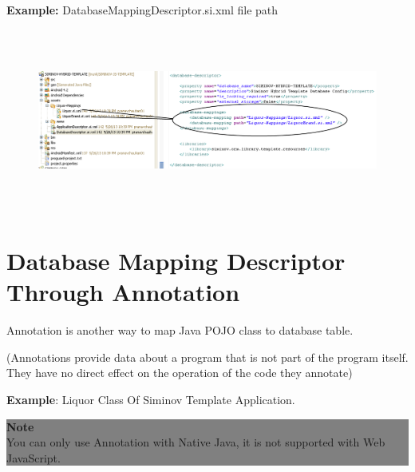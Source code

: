 		\par
		\textbf{Example:} DatabaseMappingDescriptor.si.xml file path
		\begin{figure}[htbp]
			\centering
				\includegraphics[height=6cm]{Resources/siminov_hybrid_template_database_descriptor_mapping_path_example.png}
		\end{figure}


\newpage
\section{Database Mapping Descriptor Through Annotation}
Annotation is another way to map Java POJO class to database table.

\par
(Annotations provide data about a program that is not part of the program itself. They have no direct effect on the operation of the code they annotate)



\textbf{Example}: Liquor Class Of Siminov Template Application.


\begin{center}
		\colorbox{grey}{
			\parbox[t]{.8\linewidth}{
				\fontsize{11pt}{11pt}\selectfont %
				\vspace*{0.1cm} %
		
				\hfill \textbf{Note} \\

				\hfill 
					You can only use Annotation with Native Java, it is not supported with Web JavaScript.
	
				\vspace*{0.0cm} %
			}
		}

\end{center}



